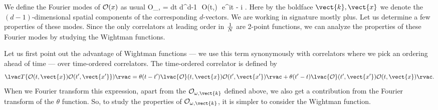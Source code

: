 We define the Fourier modes of ${\cal O}(x)$ as usual
\be
\label{okdef}
{\cal O}_{\omega,} =  \int dt d^{d-1}
 \,\,{\cal O}(t,) \,\,e^{i\omega t - i \cdot {}} .
\ee
Here by the boldface $\vect{k},\vect{x}$ we denote the $(d-1)$-dimensional spatial components of the corresponding $d$-vectors. We are working in signature mostly plus. Let us determine a few properties of these modes. Since the only correlators at leading order in ${1 \over N}$ are 2-point functions, we can analyze the properties of these Fourier modes by studying the Wightman functions. 

Let us first point out the advantage of Wightman functions --- we use
this term synonymously with correlators where we pick an ordering ahead of time ---  over time-ordered correlators. The time-ordered correlator is defined by
\[
\lvac  T\{{\cal O}(t, \vect{x}) {\cal O}(t', \vect{x'}\}) \rvac = \theta(t - t') \lvac {\cal O}(t, \vect{x}) {\cal O}(t', \vect{x'}) \rvac + \theta(t' - t) \lvac {\cal O}(t', \vect{x'}) {\cal O}(t, \vect{x}) \rvac.
 \]
When we Fourier transform this expression, apart from the ${\cal O}_{\omega,\vect{k}}$ defined above, we also get a contribution from the Fourier transform of the $\theta$ function. So, to study the properties of ${\cal O}_{\omega,\vect{k}}$, it is simpler to consider the Wightman function. 


